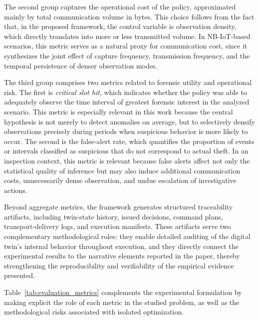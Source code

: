 \documentclass[journal]{IEEEtran}
\begin{document}
The second group captures the operational cost of the policy, approximated mainly by total communication volume in bytes. This choice follows from the fact that, in the proposed framework, the control variable is observation density, which directly translates into more or less transmitted volume. In NB-IoT-based scenarios, this metric serves as a natural proxy for communication cost, since it synthesizes the joint effect of capture frequency, transmission frequency, and the temporal persistence of denser observation modes.

The third group comprises two metrics related to forensic utility and operational risk. The first is \textit{critical slot hit}, which indicates whether the policy was able to adequately observe the time interval of greatest forensic interest in the analyzed scenario. This metric is especially relevant in this work because the central hypothesis is not merely to detect anomalies on average, but to selectively densify observations precisely during periods when suspicious behavior is more likely to occur. The second is the false-alert rate, which quantifies the proportion of events or intervals classified as suspicious that do not correspond to actual theft. In an inspection context, this metric is relevant because false alerts affect not only the statistical quality of inference but may also induce additional communication costs, unnecessarily dense observation, and undue escalation of investigative actions.

Beyond aggregate metrics, the framework generates structured traceability artifacts, including twin-state history, issued decisions, command plans, transport-delivery logs, and execution manifests. These artifacts serve two complementary methodological roles: they enable detailed auditing of the digital twin's internal behavior throughout execution, and they directly connect the experimental results to the narrative elements reported in the paper, thereby strengthening the reproducibility and verifiability of the empirical evidence presented.

Table~\ref{tab:evaluation_metrics} complements the experimental formulation by making explicit the role of each metric in the studied problem, as well as the methodological risks associated with isolated optimization.
\end{document}
